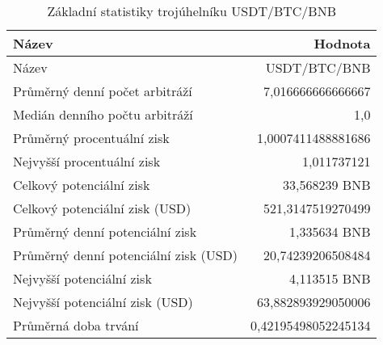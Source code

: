 \begin{table}\centering
\caption{Základní statistiky trojúhelníku USDT/BTC/BNB}
\label{USDTBTCBNB_stats}
\begin{tabular}{|| l | r ||}
\hline Název & Hodnota \\ 
\hline\hline Název & USDT/BTC/BNB \\ 
\hline Průměrný denní počet arbitráží & 7,016666666666667 \\ 
\hline Medián denního počtu arbitráží & 1,0 \\ 
\hline Průměrný procentuální zisk & 1,0007411488881686 \\ 
\hline Nejvyšší procentuální zisk & 1,011737121 \\ 
\hline Celkový potenciální zisk & 33,568239 BNB \\ 
\hline Celkový potenciální zisk (USD) & 521,3147519270499 \\ 
\hline Průměrný denní potenciální zisk & 1,335634 BNB \\ 
\hline Průměrný denní potenciální zisk (USD) & 20,74239206508484 \\ 
\hline Nejvyšší potenciální zisk & 4,113515 BNB \\ 
\hline Nejvyšší potenciální zisk (USD) & 63,882893929050006 \\ 
\hline Průměrná doba trvání & 0,42195498052245134 \\ 
\hline
\end{tabular}
\end{table}